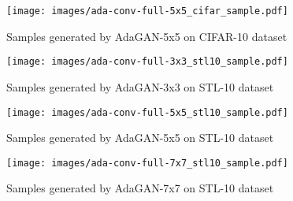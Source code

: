 \documentclass{article} %
\begin{document}
\begin{figure}[h]
\begin{center}
\texttt{[image: images/ada-conv-full-5x5\_cifar\_sample.pdf]}
\end{center}
\caption{Samples generated by AdaGAN-5x5 on CIFAR-10 dataset}
\label{fig:ada-conv-full-5x5-cifar10}
\end{figure}

\begin{figure}[h]
\begin{center}
\texttt{[image: images/ada-conv-full-3x3\_stl10\_sample.pdf]}
\end{center}
\caption{Samples generated by AdaGAN-3x3 on STL-10 dataset}
\label{fig:ada-conv-full-3x3-stl10}
\end{figure}

\begin{figure}[h]
\begin{center}
\texttt{[image: images/ada-conv-full-5x5\_stl10\_sample.pdf]}
\end{center}
\caption{Samples generated by AdaGAN-5x5 on STL-10 dataset}
\label{fig:ada-conv-full-5x5-stl10}
\end{figure}

\begin{figure}[h]
\begin{center}
\texttt{[image: images/ada-conv-full-7x7\_stl10\_sample.pdf]}
\end{center}
\caption{Samples generated by AdaGAN-7x7 on STL-10 dataset}
\label{fig:ada-conv-full-7x7-stl10}
\end{figure}
\end{document}
